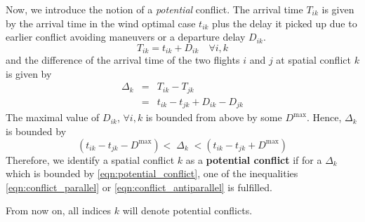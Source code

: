 \documentclass{article}
\begin{document}
Now, we introduce the notion of a \textit{potential} conflict.
The arrival time $T_{ik}$ is given by the arrival time in the wind optimal case $t_{ik}$ plus the delay it picked up due to earlier conflict avoiding maneuvers or a departure delay $D_{ik}$. 
\begin{equation*}
    T_{ik} = t_{ik} + D_{ik} \quad \forall i, k
\end{equation*}
and the difference of the arrival time of the two flights $i$ and $j$ at spatial conflict $k$ is given by
\begin{eqnarray*}
    \Delta_k &=& T_{ik} - T_{jk} \\
             &=& t_{ik} - t_{jk} + D_{ik} - D_{jk}
\end{eqnarray*}
The maximal value of $D_{ik}$, $\forall i, k$ is bounded from above by some $D^{\text{max}}$.
Hence, $\Delta_k$ is bounded by
\begin{equation} \label{eqn:potential_conflict}
    (t_{ik} - t_{jk} - D^{\text{max}})< \; \Delta_k \; < (t_{ik} - t_{jk} + D^{\text{max}})
\end{equation}
Therefore, we identify a spatial conflict $k$ as a \textbf{potential conflict} if for a $\Delta_k$ which is bounded by \eqref{eqn:potential_conflict}, one of the inequalities \eqref{eqn:conflict_parallel} or \eqref{eqn:conflict_antiparallel} is fulfilled.

From now on, all indices $k$ will denote potential conflicts.
\end{document}
